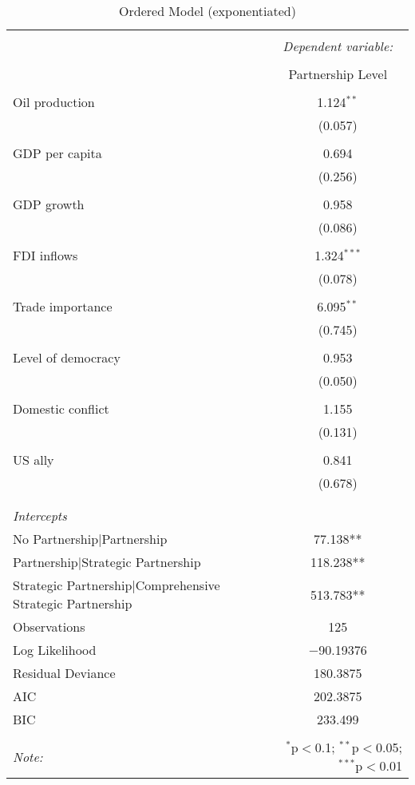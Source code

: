 \documentclass[12pt,letterpaper]{article}
\begin{document}
\begin{table}[H]
\centering 
\caption{Ordered Model (exponentiated)} 
\label{} 
\begin{tabular}{@{\extracolsep{5pt}}lc} 
\\[-1.8ex]\hline 
\hline \\[-1.8ex] 
 & \multicolumn{1}{c}{\textit{Dependent variable:}} \\ 
\cline{2-2} 
\\[-1.8ex] & Partnership Level \\ 
\hline \\[-1.8ex] 
 Oil production & 1.124$^{**}$ \\ 
  & (0.057) \\ 
  & \\ 
 GDP per capita & 0.694 \\ 
  & (0.256) \\ 
  & \\ 
 GDP growth & 0.958 \\ 
  & (0.086) \\ 
  & \\ 
 FDI inflows & 1.324$^{***}$ \\ 
  & (0.078) \\ 
  & \\ 
 Trade importance & 6.095$^{**}$ \\ 
  & (0.745) \\ 
  & \\ 
 Level of democracy & 0.953 \\ 
  & (0.050) \\ 
  & \\ 
 Domestic conflict & 1.155 \\ 
  & (0.131) \\ 
  & \\ 
 US ally & 0.841 \\ 
  & (0.678) \\ 
  & \\ 
\hline \\[-1.8ex] 
\textit{Intercepts} \\
\hline
\hline
No Partnership|Partnership & 77.138**  \\
Partnership|Strategic Partnership & 118.238**  \\
Strategic Partnership|Comprehensive Strategic Partnership & 513.783** \\
\hline
Observations & 125 \\ 
Log Likelihood & $-$90.19376 \\ 
Residual Deviance & 180.3875 \\
AIC & 202.3875 \\ 
BIC & 233.499 \\ 
\hline 
\hline \\[-1.8ex] 
\textit{Note:}  & \multicolumn{1}{r}{$^{*}$p$<$0.1; $^{**}$p$<$0.05; $^{***}$p$<$0.01} \\ 
\end{tabular}
\end{table}
\end{document}
